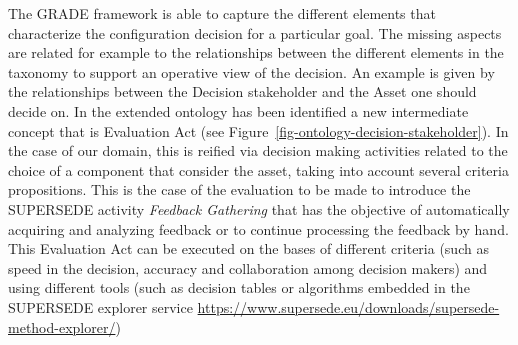 The GRADE framework is able to capture the different elements that characterize the configuration decision for a particular goal. The missing aspects are related for example to the relationships between the different elements in the taxonomy to support an operative view of the decision. An example is given by the relationships between the Decision stakeholder and the Asset one should decide on. In the extended ontology has been identified a new intermediate concept that is Evaluation Act (see Figure~\ref{fig-ontology-decision-stakeholder}). In the case of our domain, this is reified via decision making activities related to the choice of a component that consider the asset, taking into account several criteria propositions. This is the case of the evaluation to be made to introduce the SUPERSEDE activity \textit{Feedback Gathering} that has the objective of automatically acquiring and analyzing feedback or to continue processing the feedback by hand. This Evaluation Act can be executed on the bases of different criteria (such as speed in the decision, accuracy and collaboration among decision makers) and using different tools (such as decision tables or algorithms embedded in the SUPERSEDE explorer service \url{https://www.supersede.eu/downloads/supersede-method-explorer/})
